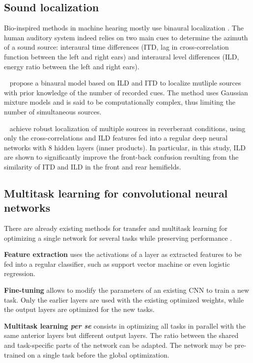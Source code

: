 \subsection{Sound localization}

Bio-inspired methods in machine hearing mostly use binaural localization \parencite{ma2015exploiting}. The human auditory system indeed relies on two main cues to determine the azimuth of a sound source: interaural time differences (ITD, lag in cross-correlation function between the left and right ears) and interaural level differences (ILD, energy ratio between the left and right ears).

\citeauthor{woodruff2012binaural}~\parencite{woodruff2012binaural, woodruff2010sequential} propose a binaural model based on ILD and ITD to localize mutliple sources with prior knowledge of the number of recorded cues. The method uses Gaussian mixture models and is said to be computationally complex, thus limiting the number of simultaneous sources.

\citeauthor{ma2015exploiting}~\parencite{ma2015exploiting} achieve robust localization of multiple sources in reverberant conditions, using only the cross-correlations and ILD features fed into a regular deep neural networks with 8 hidden layers (inner products). In particular, in this study, ILD are shown to significantly improve the front-back confusion resulting from the similarity of ITD and ILD in the front and rear hemifields.

\subsection{Multitask learning for convolutional neural networks}

There are already existing methods for transfer and multitask learning for optimizing a single network for several tasks while preserving performance \parencite{li2016learning}.

\textbf{Feature extraction} uses the activations of a layer as extracted features to be fed into a regular classifier, such as support vector machine or even logistic regression.

\textbf{Fine-tuning} allows to modify the parameters of an existing CNN to train a new task. Only the earlier layers are used with the existing optimized weights, while the output layers are optimized for the new tasks.

\textbf{Multitask learning \textit{per se}} consists in optimizing all tasks in parallel with the same anterior layers but different output layers. The ratio between the shared and task-specific parts of the network can be adapted. The network may be pre-trained on a single task before the global optimization.